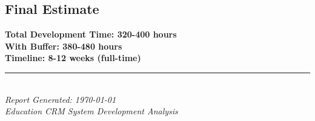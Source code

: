 \documentclass[11pt,a4paper]{article}
\begin{document}
\subsection{Final Estimate}
\begin{center}
\Large
\textbf{Total Development Time: 320-400 hours}\\
\textbf{With Buffer: 380-480 hours}\\
\textbf{Timeline: 8-12 weeks (full-time)}
\end{center}

\vspace{1cm}

\begin{center}
\rule{0.5\textwidth}{0.4pt}\\
\textit{Report Generated: \today}\\
\textit{Education CRM System Development Analysis}
\end{center}
\end{document}
